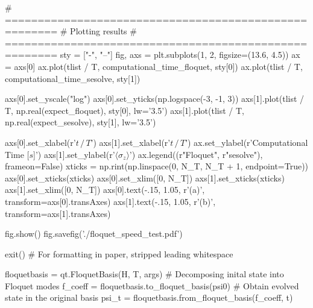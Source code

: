 # ======================================================
# Plotting results
# ======================================================
sty = ["-", "--"]
fig, axs = plt.subplots(1, 2, figsize=(13.6, 4.5))
ax = axs[0]
ax.plot(tlist / T, computational_time_floquet, sty[0])
ax.plot(tlist / T, computational_time_sesolve, sty[1])

axs[0].set_yscale("log")
axs[0].set_yticks(np.logspace(-3, -1, 3))
axs[1].plot(tlist / T, np.real(expect_floquet), sty[0], lw='3.5')
axs[1].plot(tlist / T, np.real(expect_sesolve), sty[1], lw='3.5')

axs[0].set_xlabel(r'$t \, / \, T$')
axs[1].set_xlabel(r'$t \, / \, T$')
ax.set_ylabel(r'Computational Time [$s$]')
axs[1].set_ylabel(r'$\langle \sigma_z \rangle$')
ax.legend((r"Floquet", r"sesolve"), frameon=False)
xticks = np.rint(np.linspace(0, N_T, N_T + 1, endpoint=True))
axs[0].set_xticks(xticks)
axs[0].set_xlim([0, N_T])
axs[1].set_xticks(xticks)
axs[1].set_xlim([0, N_T])
axs[0].text(-.15, 1.05, r'(a)', transform=axs[0].transAxes)
axs[1].text(-.15, 1.05, r'(b)', transform=axs[1].transAxes)

fig.show()
fig.savefig('./floquet_speed_test.pdf')



exit()
# For formatting in paper, stripped leading whitespace

floquetbasis = qt.FloquetBasis(H, T, args)
# Decomposing inital state into Floquet modes
f_coeff = floquetbasis.to_floquet_basis(psi0)
# Obtain evolved state in the original basis
psi_t = floquetbasis.from_floquet_basis(f_coeff, t)